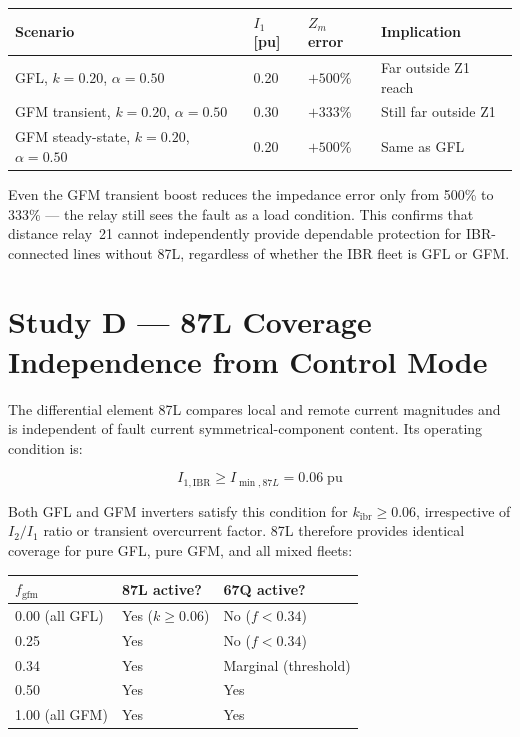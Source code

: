 \documentclass[11pt,a4paper]{article}
\begin{document}
\begin{center}
\begin{tabular}{@{}llll@{}}
\toprule
Scenario & $I_1$\,[pu] & $Z_m$ error & Implication \\
\midrule
GFL, $k=0.20$, $\alpha=0.50$ & 0.20 & $+500\%$ & Far outside Z1 reach \\
GFM transient, $k=0.20$, $\alpha=0.50$ & 0.30 & $+333\%$ & Still far outside Z1 \\
GFM steady-state, $k=0.20$, $\alpha=0.50$ & 0.20 & $+500\%$ & Same as GFL \\
\bottomrule
\end{tabular}
\end{center}

\medskip\noindent
Even the GFM transient boost reduces the impedance error only from 500\% to
333\% --- the relay still sees the fault as a load condition.  This confirms
that distance relay~21 cannot independently provide dependable protection for
IBR-connected lines without 87L, regardless of whether the IBR fleet is GFL
or GFM.

\section{Study D --- 87L Coverage Independence from Control Mode}
\label{sec:studyD}

The differential element 87L compares local and remote current magnitudes and
is independent of fault current symmetrical-component content.  Its operating
condition is:

\begin{equation}
  I_{1,\mathrm{IBR}} \geq I_{\min,87L} = 0.06\;\mathrm{pu}
\end{equation}

Both GFL and GFM inverters satisfy this condition for $k_\mathrm{ibr}\geq0.06$,
irrespective of $I_2/I_1$ ratio or transient overcurrent factor.  87L therefore
provides identical coverage for pure GFL, pure GFM, and all mixed fleets:

\begin{center}
\begin{tabular}{@{}lll@{}}
\toprule
$f_\mathrm{gfm}$ & 87L active? & 67Q active? \\
\midrule
0.00 (all GFL) & Yes ($k\geq0.06$) & No ($f<0.34$) \\
0.25           & Yes               & No ($f<0.34$) \\
0.34           & Yes               & Marginal (threshold) \\
0.50           & Yes               & Yes \\
1.00 (all GFM) & Yes               & Yes \\
\bottomrule
\end{tabular}
\end{center}
\end{document}
